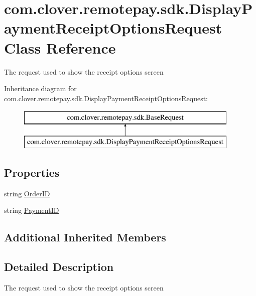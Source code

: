 \hypertarget{classcom_1_1clover_1_1remotepay_1_1sdk_1_1_display_payment_receipt_options_request}{}\section{com.\+clover.\+remotepay.\+sdk.\+Display\+Payment\+Receipt\+Options\+Request Class Reference}
\label{classcom_1_1clover_1_1remotepay_1_1sdk_1_1_display_payment_receipt_options_request}


The request used to show the receipt options screen  


Inheritance diagram for com.\+clover.\+remotepay.\+sdk.\+Display\+Payment\+Receipt\+Options\+Request\+:\begin{figure}[H]
\begin{center}
\leavevmode
\includegraphics[height=2.000000cm]{classcom_1_1clover_1_1remotepay_1_1sdk_1_1_display_payment_receipt_options_request}
\end{center}
\end{figure}
\subsection*{Properties}
\begin{DoxyCompactItemize}
\item 
string \hyperlink{classcom_1_1clover_1_1remotepay_1_1sdk_1_1_display_payment_receipt_options_request_a3148fb7709ef41dbc808890795d56177}{Order\+ID}
\item 
string \hyperlink{classcom_1_1clover_1_1remotepay_1_1sdk_1_1_display_payment_receipt_options_request_a2c1c21ab4d1057c583fbbd72e1622665}{Payment\+ID}
\end{DoxyCompactItemize}
\subsection*{Additional Inherited Members}


\subsection{Detailed Description}
The request used to show the receipt options screen 



